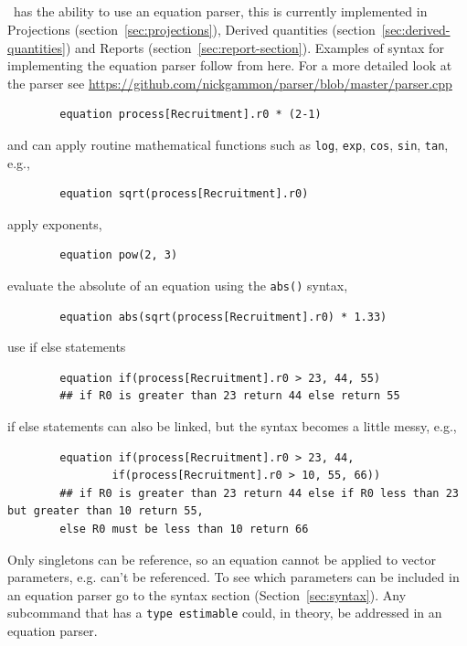 \subsection{\label{sec:eq_parser}}

\CNAME\ has the ability to use an equation parser, this is currently implemented in Projections (section~\ref{sec:projections}), Derived quantities (section~\ref{sec:derived-quantities}) and Reports (section~\ref{sec:report-section}). Examples of syntax for implementing the equation parser follow from here. For a more detailed look at the parser see \url{https://github.com/nickgammon/parser/blob/master/parser.cpp}\\


{\small{\begin{verbatim}
		equation process[Recruitment].r0 * (2-1)
		\end{verbatim}}}

and can apply routine mathematical functions such as \texttt{log},  \texttt{exp},  \texttt{cos}, \texttt{sin}, \texttt{tan}, e.g.,
{\small{\begin{verbatim}
		equation sqrt(process[Recruitment].r0)
		\end{verbatim}}}

apply exponents,
{\small{\begin{verbatim}
		equation pow(2, 3)
		\end{verbatim}}}

evaluate the absolute of an equation using the \texttt{abs()} syntax,
{\small{\begin{verbatim}
		equation abs(sqrt(process[Recruitment].r0) * 1.33)
		\end{verbatim}}}

use if else statements
{\small{\begin{verbatim}
		equation if(process[Recruitment].r0 > 23, 44, 55)
		## if R0 is greater than 23 return 44 else return 55
		\end{verbatim}}}

if else statements can also be linked, but the syntax becomes a little messy, e.g.,
{\small{\begin{verbatim}
		equation if(process[Recruitment].r0 > 23, 44,
         		if(process[Recruitment].r0 > 10, 55, 66))
		## if R0 is greater than 23 return 44 else if R0 less than 23 but greater than 10 return 55,
		else R0 must be less than 10 return 66
		\end{verbatim}}}

Only singletons can be reference, so an equation cannot be applied to vector parameters, e.g.  can't be referenced. To see which parameters can be included in an equation parser go to the syntax section (Section~\ref{sec:syntax}). Any subcommand that has a \texttt{type estimable} could, in theory, be addressed in an equation parser.

